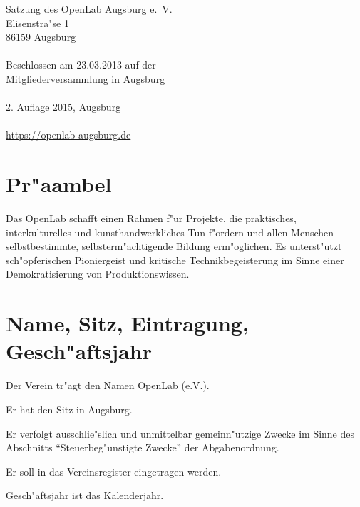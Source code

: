 \documentclass[a5paper, ngerman, 10pt]{scrreprt}
\begin{document}


\thispagestyle{empty}
\vspace*{\fill}
\begin{footnotesize}
    \begin{singlespace}
        \noindent Satzung des OpenLab Augsburg e.~V.\\
        Elisenstra"se 1\\
        86159 Augsburg\\
        \\
        Beschlossen am 23.03.2013 auf der\\
        Mitgliederversammlung in Augsburg\\
        \\
        2. Auflage 2015, Augsburg\\
        \\
        \url{https://openlab-augsburg.de}
    \end{singlespace}
\end{footnotesize}
\clearpage

\tableofcontents
\clearpage


\section*{Pr"aambel}
Das OpenLab schafft einen Rahmen f"ur Projekte, die praktisches,
interkulturelles und kunsthandwerkliches Tun f"ordern und allen Menschen
selbstbestimmte, selbsterm"achtigende Bildung erm"oglichen. Es unterst"utzt
sch"opferischen Pioniergeist und kritische Technikbegeisterung im Sinne einer
Demokratisierung von Produktionswissen.


\section{Name, Sitz, Eintragung, Gesch"aftsjahr}
\begin{compactenum}[(1)]
    \item Der Verein tr"agt den Namen OpenLab (e.V.).
    \item Er hat den Sitz in Augsburg.
    \item Er verfolgt ausschlie"slich und unmittelbar gemeinn"utzige Zwecke im
        Sinne des Abschnitts "`Steuerbeg"unstigte Zwecke"' der Abgabenordnung.
    \item Er soll in das Vereinsregister eingetragen werden.
    \item Gesch"aftsjahr ist das Kalenderjahr.
\end{compactenum}
\end{document}
